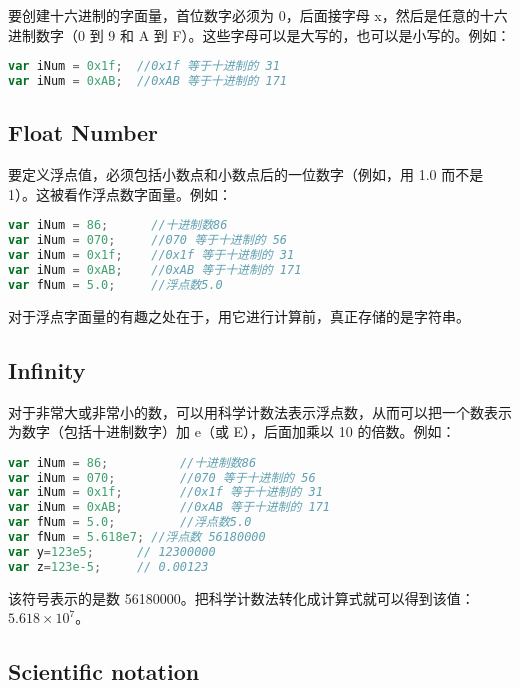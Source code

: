 要创建十六进制的字面量，首位数字必须为 0，后面接字母 x，然后是任意的十六进制数字（0 到 9 和 A 到 F）。这些字母可以是大写的，也可以是小写的。例如：



\begin{lstlisting}[language=JavaScript]
var iNum = 0x1f;  //0x1f 等于十进制的 31
var iNum = 0xAB;  //0xAB 等于十进制的 171
\end{lstlisting}


\subsection{Float Number}


要定义浮点值，必须包括小数点和小数点后的一位数字（例如，用 1.0 而不是 1）。这被看作浮点数字面量。例如：


\begin{lstlisting}[language=JavaScript]
var iNum = 86;		//十进制数86
var iNum = 070;  	//070 等于十进制的 56
var iNum = 0x1f;  	//0x1f 等于十进制的 31
var iNum = 0xAB;  	//0xAB 等于十进制的 171
var fNum = 5.0;		//浮点数5.0
\end{lstlisting}

对于浮点字面量的有趣之处在于，用它进行计算前，真正存储的是字符串。


\subsection{Infinity}


对于非常大或非常小的数，可以用科学计数法表示浮点数，从而可以把一个数表示为数字（包括十进制数字）加 e（或 E），后面加乘以 10 的倍数。例如：


\begin{lstlisting}[language=JavaScript]
var iNum = 86;			//十进制数86
var iNum = 070;  		//070 等于十进制的 56
var iNum = 0x1f;  		//0x1f 等于十进制的 31
var iNum = 0xAB;  		//0xAB 等于十进制的 171
var fNum = 5.0;			//浮点数5.0
var fNum = 5.618e7;	//浮点数 56180000
var y=123e5;      // 12300000
var z=123e-5;     // 0.00123
\end{lstlisting}

该符号表示的是数 56180000。把科学计数法转化成计算式就可以得到该值：$\text{5.618}\times \text{10}^{\text{7}}$。


\subsection{Scientific notation}




